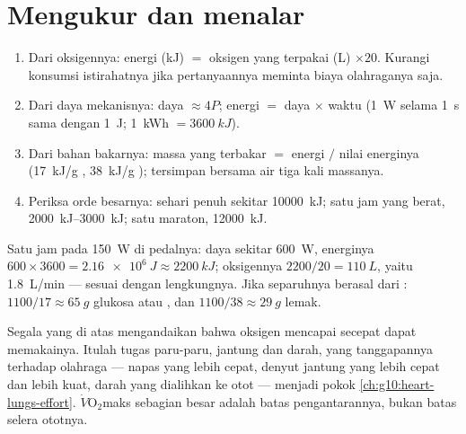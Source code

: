 \section{Mengukur dan menalar}

\begin{method}\label{met:g10:exercise-and-energy:calc}
\begin{enumerate}
  \item Dari oksigennya: energi (\unit{kJ}) $=$ oksigen yang terpakai
        (\unit{L}) $\times 20$. Kurangi konsumsi istirahatnya jika
        pertanyaannya meminta biaya olahraganya saja.
  \item Dari daya mekanisnya: daya  $\approx 4 P$; energi
        $=$ daya $\times$ waktu (\qty{1}{W} selama \qty{1}{s} sama
        dengan \qty{1}{J}; \qty{1}{kWh} $= \qty{3600}{kJ}$).
  \item Dari bahan bakarnya: massa yang terbakar $=$ energi $/$ nilai
        energinya (\qty{17}{kJ/g} , \qty{38}{kJ/g} );
         tersimpan bersama air tiga kali massanya.
  \item Periksa orde besarnya: sehari penuh sekitar \qty{10000}{kJ};
        satu jam yang berat, \qtyrange{2000}{3000}{kJ}; satu maraton,
        \qty{12000}{kJ}.
\end{enumerate}
\end{method}

\begin{example}\label{ex:g10:exercise-and-energy:hour}
Satu jam pada \qty{150}{W} di pedalnya: daya  sekitar
\qty{600}{W}, energinya $600 \times 3600 = \qty{2.16e6}{J} \approx
\qty{2200}{kJ}$; oksigennya $2200/20 = \qty{110}{L}$, yaitu \qty{1.8}{L/min}
--- sesuai dengan lengkungnya. Jika separuhnya berasal dari
: $1100/17 \approx \qty{65}{g}$ glukosa atau , dan
$1100/38 \approx \qty{29}{g}$ lemak.
\end{example}

\begin{remark}\label{rem:g10:exercise-and-energy:delivery}
Segala yang di atas mengandaikan bahwa oksigen mencapai 
secepat  dapat memakainya. Itulah tugas paru-paru, jantung
dan darah, yang tanggapannya terhadap olahraga --- napas yang lebih
cepat, denyut jantung yang lebih cepat dan lebih kuat, darah yang
dialihkan ke otot --- menjadi pokok \cref{ch:g10:heart-lungs-effort}.
$\dot V\!\mathrm{O_2}$maks sebagian besar adalah batas pengantarannya,
bukan batas selera ototnya.
\end{remark}

